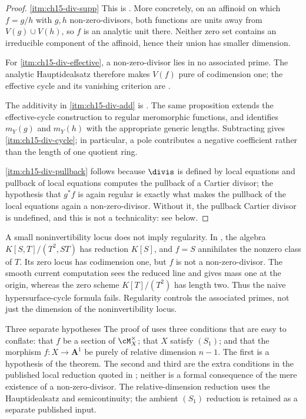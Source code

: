 \begin{proof}
\cref{itm:ch15-div-supp}
This is \cite[\S13.6.4 and \S13.6.7]{CLD25}.  More concretely, on an
affinoid on which $f=g/h$ with $g,h$ non-zero-divisors, both functions are
units away from $V(g)\cup V(h)$, so $f$ is an analytic unit there.  Neither
zero set contains an irreducible component of the affinoid, hence their
union has smaller dimension.

For \cref{itm:ch15-div-effective}, a non-zero-divisor lies in no associated
prime.  The analytic Hauptidealsatz
\cite[Lemma~11.5.2]{CLD25} therefore makes $V(f)$ pure of codimension one;
the effective cycle and its vanishing criterion are
\cite[\S13.7.1]{CLD25}.

The additivity in \cref{itm:ch15-div-add} is
\cite[Lemma~13.7.3 and Proposition~13.7.4]{CLD25}.  The same proposition
extends the effective-cycle construction to regular meromorphic functions,
and \cite[Lemma~13.7.2]{CLD25} identifies $m_Y(g)$ and $m_Y(h)$ with the
appropriate generic lengths.  Subtracting gives
\cref{itm:ch15-div-cycle}; in particular, a pole contributes a negative
coefficient rather than the length of one quotient ring.

\cref{itm:ch15-div-pullback} follows because $\divis$ is defined by local
equations and pullback of local equations computes the pullback of a Cartier
divisor; the hypothesis that $g^*f$ is again regular is exactly what makes
the pullback of the local equations again a non-zero-divisor.  Without it,
the pullback Cartier divisor is undefined, and this is not a technicality:
see  below.
\end{proof}

\begin{remark}
\label{rem:ch15-nonregular}
A small noninvertibility locus does not imply regularity. In
\cite[Example~16.1.4]{CLD25}, the algebra
$K[S,T]/(T^2,ST)$ has reduction $K[S]$, and $f=S$ annihilates the nonzero
class of $T$. Its zero locus has codimension one, but $f$ is not a
non-zero-divisor. The smooth current computation sees the reduced line
and gives mass one at the origin, whereas the zero scheme
$K[T]/(T^2)$ has length two. Thus the naive hypersurface-cycle formula
fails. Regularity controls the associated primes, not just the dimension
of the noninvertibility locus.
\end{remark}

\begin{warning}{Three separate hypotheses}
The proof of  uses three conditions that are
easy to conflate: that $f$ be a section of $\cM_X^\times$; that $X$ satisfy
$(S_1)$; and that the morphism $f:X\to\mathbf A^1$ be purely of relative
dimension $n-1$.  The first is a hypothesis of the theorem.  The second and
third are the extra conditions in the published local reduction quoted in
; neither is a formal consequence of the
mere existence of a non-zero-divisor.  The relative-dimension reduction
uses the Hauptidealsatz and semicontinuity; the ambient $(S_1)$ reduction
is retained as a separate published input.
\end{warning}

